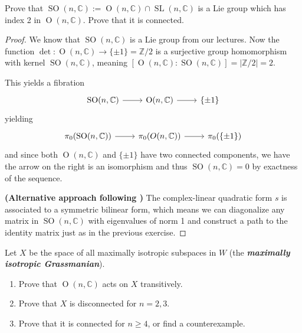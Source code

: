 \documentclass{article}
\newcommand{\Z}{\mathbb{Z}}
\newcommand{\C}{\mathbb{C}}
\renewcommand{\O}{\operatorname{O}}
\DeclareMathOperator{\SL}{SL}
\DeclareMathOperator{\SO}{SO}
\begin{document}
\begin{exercise}
	Prove that $\SO(n, \C) := \O(n, \C) \cap \SL(n, \C)$ is a Lie group
	which has index 2 in $\O(n, \C)$. Prove that it is connected.
\end{exercise}
\begin{proof}
	We know  that $\SO(n,\C)$ is a Lie group from our lectures. Now the function $\det:\O(n,\C)\to\{\pm1\}=\Z/2$ is a surjective group homomorphism with kernel $\SO(n,\C)$, meaning $[\O(n,\C):\SO(n,\C)]=|\Z/2|=2$.
	
	This yields a fibration
	\[\begin{tikzcd}
		\SO(n,\C)\arrow[r]&\O(n,\C)\arrow[r]&\{\pm1\}
	\end{tikzcd}\]
	yielding
	\[\begin{tikzcd}
		\pi_0(\SO(n,\C))\arrow[r]&\pi_0(O(n,\C))\arrow[r]&\pi_0(\{\pm1\})
	\end{tikzcd}\]
	and since both $\O(n,\C)$ and $\{\pm1\}$ have two connected components, we have the arrow on the right is an isomorphism and thus $\SO(n,\C)=0$ by exactness of the sequence.
	
	\textbf{(Alternative approach following \cite{hall})} The complex-linear quadratic form $s$ is associated to a symmetric bilinear form, which means we can diagonalize any matrix in $\SO(n,\C)$ with eigenvalues of norm 1 and construct a path to the identity matrix just as in the previous exercise.
\end{proof}

\begin{exercise}
	Let $X$ be the space of all maximally isotropic subspaces in $W$ (the \textbf{\textit{maximally isotropic Grassmanian}}).
	\begin{enumerate}[label*=(\alph*)]
		\item Prove that $\O(n,\C)$ acts on $X$ transitively.
		\item Prove that $X$ is disconnected for $n=2,3$.
		\item Prove that it is connected for $n\geq4$, or find a counterexample.
	\end{enumerate}
\end{exercise}
\end{document}
